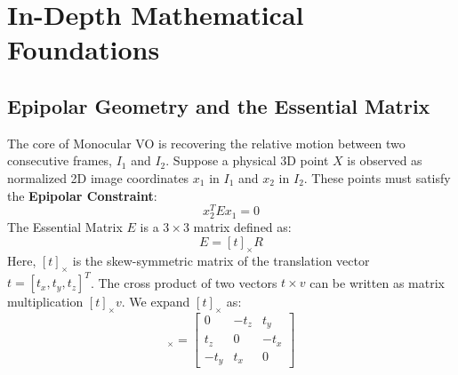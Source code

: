 \documentclass[12pt]{article}
\begin{document}
\section{In-Depth Mathematical Foundations}

\subsection{Epipolar Geometry and the Essential Matrix}
The core of Monocular VO is recovering the relative motion between two consecutive frames, $I_1$ and $I_2$. Suppose a physical 3D point $X$ is observed as normalized 2D image coordinates $x_1$ in $I_1$ and $x_2$ in $I_2$. These points must satisfy the \textbf{Epipolar Constraint}:
\begin{equation}
    x_2^T E x_1 = 0
\end{equation}
The Essential Matrix $E$ is a $3 \times 3$ matrix defined as:
\begin{equation}
    E = [t]_{\times} R
\end{equation}
Here, $[t]_{\times}$ is the skew-symmetric matrix of the translation vector $t = [t_x, t_y, t_z]^T$. The cross product of two vectors $t \times v$ can be written as matrix multiplication $[t]_{\times} v$. We expand $[t]_{\times}$ as:
\begin{equation}
    [t]_{\times} = \begin{bmatrix} 
    0 & -t_z & t_y \\ 
    t_z & 0 & -t_x \\ 
    -t_y & t_x & 0 
    \end{bmatrix}
\end{equation}
\end{document}
